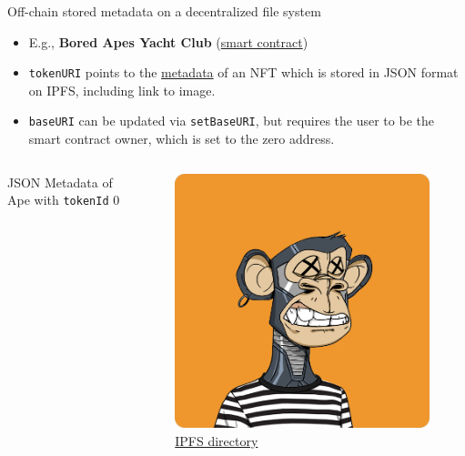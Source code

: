 \documentclass[handout]{beamer}
\begin{document}
\begin{frame}{Off-chain stored metadata on a decentralized file system}

	\begin{itemize}
		\item E.g., \textbf{Bored Apes Yacht Club} (\href{https://etherscan.io/address/0xbc4ca0eda7647a8ab7c2061c2e118a18a936f13d}{\link smart contract})
		\item \texttt{tokenURI} points to the \href{ipfs://QmeSjSinHpPnmXmspMjwiXyN6zS4E9zccariGR3jxcaWtq/1}{\link metadata}  of an NFT which is stored in JSON format on IPFS, including link to image.
		\item \texttt{baseURI} can be updated via \texttt{setBaseURI}, but requires the user to be the smart contract owner, which is set to the zero address.
	\end{itemize} 
	\begin{columns}
		\begin{column}{0.67\textwidth}
		\vspace{-1em}
			\begin{samplecode}{JSON Metadata of Ape with \texttt{tokenId} 0}
				
			\end{samplecode}		
		\end{column}
		\begin{column}{0.35\textwidth}
			\begin{figure}
				\vspace{-1em}
				\centering
				\includegraphics[scale=0.18]{../assets/images/ape_0.png}
				\caption*{\link \href{https://bafybeibnzhc7vp4hnfcocw7s2jej2tj5xqpwseyz3ifylismh47cr45rhm.ipfs.dweb.link/}{IPFS directory}}	
			\end{figure}
		\end{column}
	\end{columns}
\end{frame}
\end{document}
